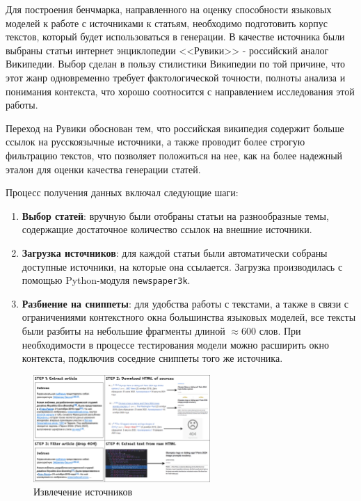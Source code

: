 \documentclass{article}
\theoremstyle{definition}
\theoremstyle{plain}
\begin{document}
Для построения бенчмарка, направленного на оценку способности языковых моделей к работе с источниками к статьям, необходимо подготовить корпус текстов, который будет использоваться в генерации. 
В качестве источника были выбраны статьи интернет энциклопедии <<Рувики>> - российский аналог Википедии. Выбор сделан в пользу стилистики Википедии по той причине, что этот жанр
одновременно требует фактологической точности, полноты анализа и понимания контекста, что хорошо соотносится с направлением исследования этой работы.

Переход на Рувики обоснован тем, что российская википедия содержит больше ссылок на русскоязычные источники, а также проводит более строгую фильтрацию текстов, 
что позволяет положиться на нее, как на более надежный эталон для оценки качества генерации статей.

Процесс получения данных включал следующие шаги:

\begin{enumerate}

    \item \textbf{Выбор статей}: вручную были отобраны статьи на разнообразные темы, 
    содержащие достаточное количество ссылок на внешние источники.
    
    \item \textbf{Загрузка источников}: для каждой статьи были автоматически собраны доступные источники, на которые она ссылается. 
    Загрузка производилась с помощью Python-модуля \texttt{newspaper3k}.
    
    \item \textbf{Разбиение на сниппеты}: для удобства работы с текстами, а также в связи с ограничениями контекстного окна большинства языковых моделей, 
    все тексты были разбиты на небольшие фрагменты длиной $\approx 600$ слов. 
    При необходимости в процессе тестирования модели можно расширить окно контекста, подключив соседние сниппеты того же источника.

\end{enumerate}

\begin{figure}[ht!]
  \centering
  \includegraphics[width=0.6\textwidth]{figures/Source_extract.png}%
  \caption{Извлечение источников}
  \label{fig:source}
\end{figure}
\end{document}
